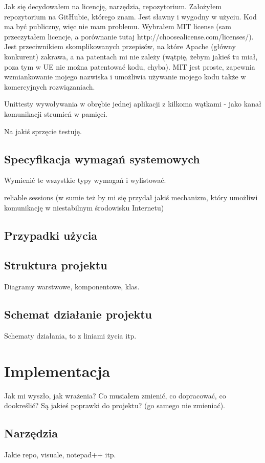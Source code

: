 \documentclass[twoside,a4paper]{book}
\begin{document}
Jak się decydowałem na licencję, narzędzia, repozytorium.
Założyłem repozytorium na GitHubie, którego znam. Jest sławny i wygodny w użyciu. Kod ma być publiczny, więc nie mam problemu. Wybrałem MIT license (sam przeczytałem licencje, a porównanie tutaj http://choosealicense.com/licenses/). Jest przeciwnikiem skomplikowanych przepisów, na które Apache (główny konkurent) zakrawa, a na patentach mi nie zależy (wątpię, żebym jakieś tu miał, poza tym w UE nie można patentować kodu, chyba). MIT jest proste, zapewnia wzmiankowanie mojego nazwiska i umożliwia używanie mojego kodu także w komercyjnych rozwiązaniach.

Unittesty wywoływania w obrębie jednej aplikacji z kilkoma wątkami - jako kanał komunikacji strumień w pamięci.

Na jakiś sprzęcie testuję.

\section{Specyfikacja wymagań systemowych}
Wymienić te wszystkie typy wymagań i wylistować.

reliable sessions (w sumie też by mi się przydał jakiś mechanizm, który umożliwi komunikację w niestabilnym środowisku Internetu)

\section{Przypadki użycia}

\section{Struktura projektu}
Diagramy warstwowe, komponentowe, klas.

\section{Schemat działanie projektu}
Schematy działania, to z liniami życia itp.


\chapter{Implementacja}
Jak mi wyszło, jak wrażenia? Co musiałem zmienić, co dopracować, co dookreślić? Są jakieś poprawki do projektu? (go samego nie zmieniać).

\section{Narzędzia}
Jakie repo, visuale, notepad++ itp.
\end{document}
